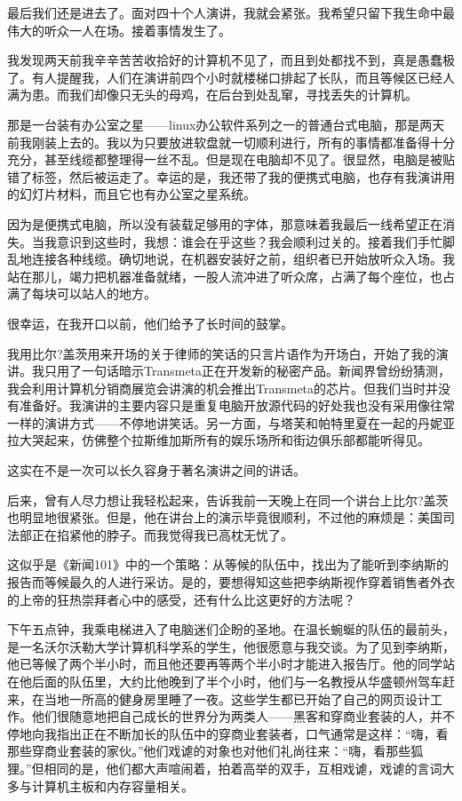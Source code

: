 最后我们还是进去了。面对四十个人演讲，我就会紧张。我希望只留下我生命中最伟大的听众一人在场。接着事情发生了。

我发现两天前我辛辛苦苦收拾好的计算机不见了，而且到处都找不到，真是愚蠢极了。有人提醒我，人们在演讲前四个小时就楼梯口排起了长队，而且等候区已经人满为患。而我们却像只无头的母鸡，在后台到处乱窜，寻找丢失的计算机。

那是一台装有办公室之星——linux办公软件系列之一的普通台式电脑，那是两天前我刚装上去的。我以为只要放进软盘就一切顺利进行，所有的事情都准备得十分充分，甚至线缆都整理得一丝不乱。但是现在电脑却不见了。很显然，电脑是被贴错了标签，然后被运走了。幸运的是，我还带了我的便携式电脑，也存有我演讲用的幻灯片材料，而且它也有办公室之星系统。

因为是便携式电脑，所以没有装载足够用的字体，那意味着我最后一线希望正在消失。当我意识到这些时，我想：谁会在乎这些？我会顺利过关的。接着我们手忙脚乱地连接各种线缆。确切地说，在机器安装好之前，组织者已开始放听众入场。我站在那儿，竭力把机器准备就绪，一股人流冲进了听众席，占满了每个座位，也占满了每块可以站人的地方。

很幸运，在我开口以前，他们给予了长时间的鼓掌。

我用比尔?盖茨用来开场的关于律师的笑话的只言片语作为开场白，开始了我的演讲。我只用了一句话暗示Transmeta正在开发新的秘密产品。新闻界曾纷纷猜测，我会利用计算机分销商展览会讲演的机会推出Transmeta的芯片。但我们当时并没有准备好。我演讲的主要内容只是重复电脑开放源代码的好处我也没有采用像往常一样的演讲方式——不停地讲笑话。另一方面，与塔芙和帕特里夏在一起的丹妮亚拉大哭起来，仿佛整个拉斯维加斯所有的娱乐场所和街边俱乐部都能听得见。

这实在不是一次可以长久容身于著名演讲之间的讲话。

后来，曾有人尽力想让我轻松起来，告诉我前一天晚上在同一个讲台上比尔?盖茨也明显地很紧张。但是，他在讲台上的演示毕竟很顺利，不过他的麻烦是：美国司法部正在掐紧他的脖子。而我觉得我已高枕无忧了。

 

这似乎是《新闻101》中的一个策略：从等候的队伍中，找出为了能听到李纳斯的报告而等候最久的人进行采访。是的，要想得知这些把李纳斯视作穿着销售者外衣的上帝的狂热崇拜者心中的感受，还有什么比这更好的方法呢？

下午五点钟，我乘电梯进入了电脑迷们企盼的圣地。在温长蜿蜒的队伍的最前头，是一名沃尔沃勒大学计算机科学系的学生，他很愿意与我交谈。为了见到李纳斯，他已等候了两个半小时，而且他还要再等两个半小时才能进入报告厅。他的同学站在他后面的队伍里，大约比他晚到了半个小时，他们与一名教授从华盛顿州驾车赶来，在当地一所高的健身房里睡了一夜。这些学生都已开始了自己的网页设计工作。他们很随意地把自己成长的世界分为两类人——黑客和穿商业套装的人，并不停地向我指出正在不断加长的队伍中的穿商业套装者，口气通常是这样：“嗨，看那些穿商业套装的家伙。”他们戏谑的对象也对他们礼尚往来：“嗨，看那些狐狸。”但相同的是，他们都大声喧闹着，拍着高举的双手，互相戏谑，戏谑的言词大多与计算机主板和内存容量相关。


